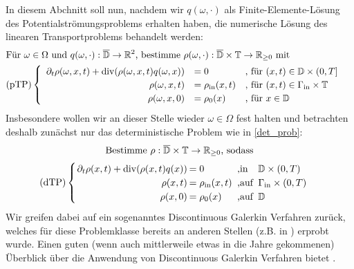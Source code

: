 
In diesem Abchnitt soll nun, nachdem wir $q(\omega,\cdot)$ als Finite-Elemente-Lösung des Potentialströmungsproblems erhalten haben, die numerische Lösung des linearen Transportproblems behandelt werden:
\begin{align*}
	&\text{Für } \omega \in \Omega \text{ und }q(\omega,\cdot): \overline{\mathbb{D}} \to \mathbb{R}^2 \text{, bestimme }\rho(\omega,\cdot): \overline{\mathbb{D}} \times \mathbb{T} \to \mathbb{R}_{\geq 0} \text{ mit} \\
	&\text{(pTP)} 
	\begin{cases}
	\begin{array}{rlll}
	\partial_t \rho (\omega, x, t) + \operatorname{div}(\rho(\omega,x,t)q(\omega,x)) &= 0 &\text{, für } (x,t) \in \mathbb{D} \times (0,T] \\
	\rho(\omega,x,t) &= \rho_{\text{in}}(x,t) &\text{, für } (x,t) \in \Gamma_{\text{in}} \times \mathbb{T} \\
	\rho(\omega,x,0)  &= \rho_0(x) &\text{, für } x \in  \mathbb{D}
	\end{array}
	\end{cases} \\
\end{align*}
Insbesondere wollen wir an dieser Stelle wieder $\omega \in \Omega$ fest halten und betrachten deshalb zunächst nur das deterministische Problem wie in \ref{det_prob}:
\[ 
\text{Bestimme } \rho: \overline{\mathbb{D}} \times \mathbb{T} \to \R_{\geq 0} \text{, sodass} \newline \]
\[\setlength\arraycolsep{1pt}
\text{(dTP)}\begin{cases} 
\begin{array}{rlll}
\partial_t \rho(x,t) + \dive(\rho(x,t) q(x)) &= 0 &\text{ ,in } &\mathbb{D} \times (0,T)\\
\rho(x,t) &= \rho_{\text{in}}(x,t) &\text{ ,auf } &\Gamma_{\text{in}} \times (0,T)\\
\rho(x,0) &= \rho_0(x) &\text{ ,auf } &\mathbb{D} \\
\end{array}
\end{cases} \\
\]
 Wir greifen dabei auf ein sogenanntes Discontinuous Galerkin Verfahren zurück, welches für diese Problemklasse bereits an anderen Stellen (z.B. in \cite{cockburn1998runge}) erprobt wurde. Einen guten (wenn auch mittlerweile etwas in die Jahre gekommenen) Überblick über die Anwendung von Discontinuous Galerkin Verfahren bietet \cite{cockburn2000development}.
